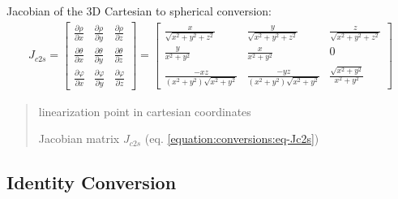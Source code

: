 \documentclass[letterpaper,10pt,english]{sphinxmanual}
\begin{document}
\begin{fulllineitems}
\label{\detokenize{conversions:conversions.J_c2s}}
\pysigstartsignatures
{}
\pysigstopsignatures
\sphinxAtStartPar
Jacobian of the 3D Cartesian to spherical conversion:
\begin{equation}\label{equation:conversions:eq-Jc2s}
\begin{split}J_{c2s} = \begin{bmatrix} \frac{\partial \rho}{\partial x} & \frac{\partial \rho}{\partial y} & \frac{\partial \rho}{\partial z} \\ \frac{\partial \theta}{\partial x} & \frac{\partial \theta}{\partial y} & \frac{\partial \theta}{\partial z} \\ \frac{\partial \varphi}{\partial x} & \frac{\partial \varphi}{\partial y} & \frac{\partial \varphi}{\partial z} \end{bmatrix} = \begin{bmatrix} \frac{x}{\sqrt{x^2+y^2+z^2}} & \frac{y}{\sqrt{x^2+y^2+z^2}} & \frac{z}{\sqrt{x^2+y^2+z^2}} \\ \frac{y}{x^2+y^2} & \frac{x}{x^2+y^2} & 0 \\ \frac{-x z}{(x^2+y^2)\sqrt{x^2+y^2}} & \frac{-y z}{(x^2+y^2)\sqrt{x^2+y^2}} & \frac{\sqrt{x^2+y^2}}{x^2+y^2} \end{bmatrix}\end{split}
\end{equation}\begin{quote}\begin{description}
\sphinxAtStartPar
{} \textendash{} linearization point in cartesian coordinates

\sphinxAtStartPar
Jacobian matrix \(J_{c2s}\) (eq. \eqref{equation:conversions:eq-Jc2s})

\end{description}\end{quote}

\end{fulllineitems}



\subsection{Identity Conversion}
\label{\detokenize{conversions:identity-conversion}}
\end{document}
